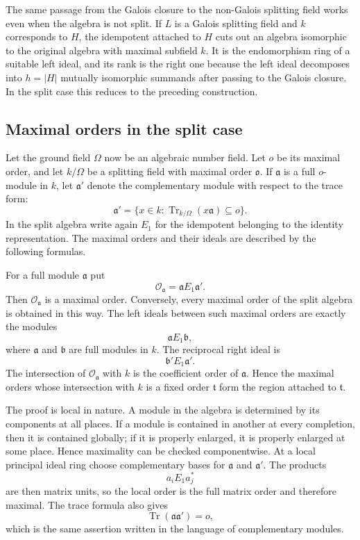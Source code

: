 \documentclass[12pt]{article}
\begin{document}
The same passage from the Galois closure to the non-Galois splitting field works even when the algebra is not split. If \(L\) is a Galois splitting field and \(k\) corresponds to \(H\), the idempotent attached to \(H\) cuts out an algebra isomorphic to the original algebra with maximal subfield \(k\). It is the endomorphism ring of a suitable left ideal, and its rank is the right one because the left ideal decomposes into \(h=|H|\) mutually isomorphic summands after passing to the Galois closure. In the split case this reduces to the preceding construction.

\subsection{Maximal orders in the split case}

Let the ground field \(\Omega\) now be an algebraic number field. Let \(o\) be its maximal order, and let \(k/\Omega\) be a splitting field with maximal order \(\mathfrak o\). If \(\mathfrak a\) is a full \(o\)-module in \(k\), let \(\mathfrak a'\) denote the complementary module with respect to the trace form:
\[
  \mathfrak a'=\{x\in k: \operatorname{Tr}_{k/\Omega}(x\mathfrak a)\subseteq o\}.
\]
In the split algebra write again \(E_1\) for the idempotent belonging to the identity representation. The maximal orders and their ideals are described by the following formulas.

For a full module \(\mathfrak a\) put
\[
  \mathcal O_{\mathfrak a}=\mathfrak a E_1\mathfrak a'.
\]
Then \(\mathcal O_{\mathfrak a}\) is a maximal order. Conversely, every maximal order of the split algebra is obtained in this way. The left ideals between such maximal orders are exactly the modules
\[
  \mathfrak aE_1\mathfrak b,
\]
where \(\mathfrak a\) and \(\mathfrak b\) are full modules in \(k\). The reciprocal right ideal is
\[
  \mathfrak b'E_1\mathfrak a'.
\]
The intersection of \(\mathcal O_{\mathfrak a}\) with \(k\) is the coefficient order of \(\mathfrak a\). Hence the maximal orders whose intersection with \(k\) is a fixed order \(\mathfrak t\) form the region attached to \(\mathfrak t\).

The proof is local in nature. A module in the algebra is determined by its components at all places. If a module is contained in another at every completion, then it is contained globally; if it is properly enlarged, it is properly enlarged at some place. Hence maximality can be checked componentwise. At a local principal ideal ring choose complementary bases for \(\mathfrak a\) and \(\mathfrak a'\). The products
\[
  a_iE_1a_j^*
\]
are then matrix units, so the local order is the full matrix order and therefore maximal. The trace formula also gives
\[
  \operatorname{Tr}(\mathfrak a\mathfrak a')=o,
\]
which is the same assertion written in the language of complementary modules.
\end{document}
